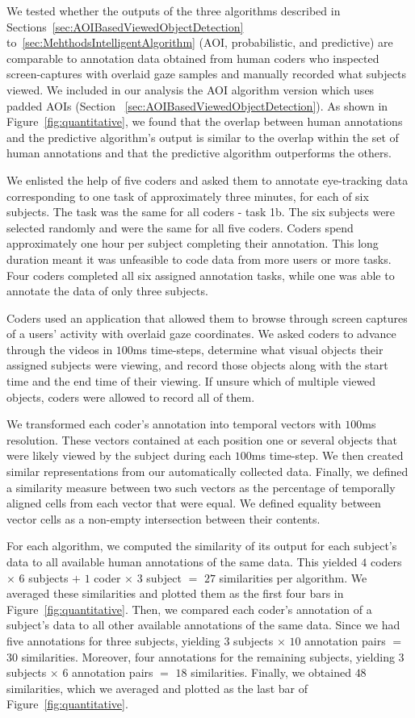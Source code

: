 We tested whether the outputs of the three algorithms described in Sections~\ref{sec:AOIBasedViewedObjectDetection} to~\ref{sec:MehthodsIntelligentAlgorithm} (AOI, probabilistic, and predictive) are comparable to annotation data obtained from human coders who inspected screen-captures with overlaid gaze samples and manually recorded what subjects viewed. We included in our analysis the AOI algorithm version which uses padded AOIs (Section ~\ref{sec:AOIBasedViewedObjectDetection}). As shown in Figure~\ref{fig:quantitative}, we found that the overlap between human annotations and the predictive algorithm's output is similar to the overlap within the set of human annotations and that the predictive algorithm outperforms the others. 

We enlisted the help of five coders and asked them to annotate eye-tracking data corresponding to one task of approximately three minutes, for each of six subjects.  The task was the same for all coders - task 1b. The six subjects were selected randomly and were the same for all five coders. Coders spend approximately one hour per subject completing their annotation. This long duration meant it was unfeasible to code data from more users or more tasks. Four coders completed all six assigned annotation tasks, while one was able to annotate the data of only three subjects. 

Coders used an application that allowed them to browse through screen captures of a users' activity with overlaid gaze coordinates. We asked coders to advance through the videos in $100$ms time-steps, determine what visual objects their assigned subjects were viewing, and record those objects along with the start time and the end time of their viewing. If unsure which of multiple viewed objects, coders were allowed to record all of them.  

We transformed each coder's annotation into temporal vectors with $100$ms resolution. These vectors contained at each position one or several objects that were likely viewed by the subject during each $100$ms time-step. We then created similar representations from our automatically collected data. Finally, we defined a similarity measure between two such vectors as the percentage of temporally aligned cells from each vector that were equal. We defined equality between vector cells as a non-empty intersection between their contents.  

For each algorithm, we computed the similarity of its output for each subject's data to all available human annotations of the same data.  This yielded $4$ coders $\times$ $6$ subjects $+$  $1$ coder $\times$ $3$ subject $=$ $27$ similarities per algorithm. We averaged these similarities and plotted them as the first four bars in Figure~\ref{fig:quantitative}. Then, we compared each coder's annotation of a subject's data to all other available annotations of the same data. Since we had five annotations for three subjects, yielding $3$ subjects $\times$ $10$ annotation pairs $=$ $30$ similarities. Moreover, four annotations for the remaining subjects, yielding $3$ subjects $\times$ $6$ annotation pairs $=$ $18$ similarities. Finally,  we obtained $48$ similarities, which we averaged and plotted as the last bar of Figure~\ref{fig:quantitative}.

